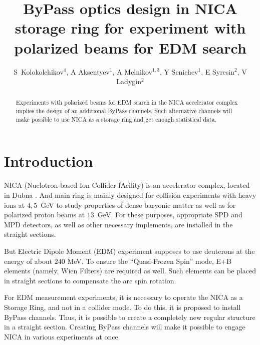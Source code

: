 \documentclass[a4paper]{jpconf}
\newcommand{\lapki}[1]{``#1''}%
\begin{document}
\title{ByPass optics design in NICA storage ring for experiment with polarized beams for EDM search}

\author{S~Kolokolchikov$^4$, A Aksentyev$^1$, A Melnikov$^{1,3}$, Y Senichev$^1$, E Syresin$^2$, V Ladygin$^2$}

\address{$^1$Institute for Nuclear Research of the Russian Academy of Sciences, Moscow, Russia\\
	$^2$Joint Institute for Nuclear Research, Dubna, Russia,\\
	$^3$Landau Institute of Theoretical Physics, Chernogolovka, Russia,\\
	$^4$International Union of Pure and Applied Physics, Switzerland}


\begin{abstract}
Experiments with polarized beams for EDM search in the NICA accelerator complex implies the design of an additional ByPass channels. Such alternative channels will make possible to use NICA as a storage ring and get enough statistical data.
\end{abstract}

\section{Introduction}

\par NICA (Nuclotron-based Ion Collider fAcility) is an accelerator complex, located in Dubna \cite{NICA}.
And main ring is mainly designed for collision experiments with heavy ions at $4,5$~GeV to study properties of dense baryonic matter as well as for polarized proton beams at $13$~GeV. For these purposes, appropriate SPD and MPD detectors, as well as other
necessary implements, are installed in the straight sections. 

\par But Electric Dipole Moment (EDM) experiment supposes to use deuterons at the energy of about $240$ MeV. 
To ensure the \lapki{Quasi-Frozen Spin} mode, E+B elements (namely, Wien Filters) are
required as well. Such elements can be placed in straight sections to compensate the arc spin rotation. 

\par For EDM measurement experiments, it is necessary to operate the NICA as a Storage Ring, and not in a collider
mode. To do this, it is proposed to install ByPass channels. Thus, it is possible to create a completely new
regular structure in a straight section. Creating ByPass channels will make it possible to engage NICA in various
experiments at once.
\end{document}
